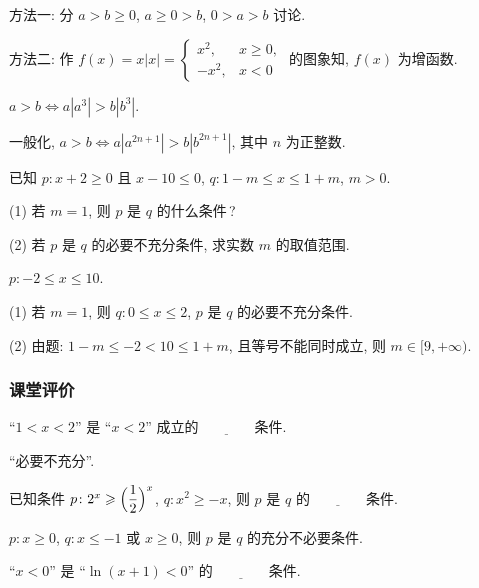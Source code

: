   \beginsolution
    方法一: 分 $a>b\geqslant 0$, $a\geqslant 0>b$, $0>a>b$ 讨论.
    
    方法二: 作 $f(x)= x|x|= \begin{cases}
      x^2,& x\geqslant 0,\\
      -x^2,& x<0 \end{cases}$ 的图象知, $f(x)$ 为增函数.
    
    \varexercise $a>b\Leftrightarrow a|a^3|>b|b^3|$.
    
    \varexercise 一般化, $a>b\Leftrightarrow a|a^{2n+1}|>b|b^{2n+1}|$, 其中 $n$ 为正整数.
  \endsolution
  
  \begin{example}
    已知 $p\colon x+2\geqslant 0$ 且 $x-10\leqslant 0$, 
    $q\colon 1-m\leqslant x\leqslant 1+m$, $m>0$.
    
    (1) 若 $m=1$, 则 $p$ 是 $q$ 的什么条件\,?
    
    (2) 若 $p$ 是 $q$ 的必要不充分条件, 求实数 $m$ 的取值范围.
  \end{example}

  \beginsolution
    $p\colon -2\leqslant x\leqslant 10$.
    
    (1) 若 $m=1$, 则 $q\colon 0\leqslant x\leqslant 2$, $p$ 是 $q$ 的必要不充分条件.
    
    (2) 由题: $1-m\leqslant -2< 10\leqslant 1+m$, 且等号不能同时成立, 则 $m\in[9,+\infty)$.
  \endsolution
  
  \subsubsection{课堂评价}
  \begin{exercise}
    ``$1<x<2$'' 是 ``$x<2$'' 成立的$\underline{\qquad\qquad}$条件.
  \end{exercise}

  \beginsolution
    ``必要不充分''.
  \endsolution
  
  \begin{exercise}
    已知条件 $p\colon 2^x \geqslant \Bigl(\dfrac12\Bigr)^x$, 
    $q\colon x^2 \geqslant -x$, 则 $p$ 是 $q$ 的$\underline{\qquad\qquad}$条件.
  \end{exercise}

  \beginsolution
    $p\colon x\geqslant 0$, $q\colon x\leqslant -1$ 或 $x\geqslant 0$, 则 $p$ 是 $q$ 的充分不必要条件.
  \endsolution
  
  \begin{exercise}
    ``$x<0$'' 是 ``$\ln(x+1)<0$'' 的$\underline{\qquad\qquad}$条件.
  \end{exercise}

